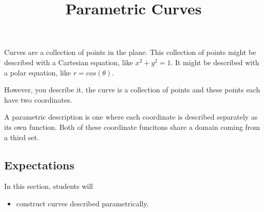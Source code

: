 \documentclass{ximera}
\title{Parametric Curves}
\begin{document}
\begin{abstract}
%
\end{abstract}
\maketitle




Curves are a collection of points in the plane.  This collection of points might be described with a Cartesian equation, like $x^2 + y^2 = 1$.  It might be described with a polar equation, like $r = cos(\theta)$.

However, you describe it, the curve is a collection of points and these points each have two coordinates.


A parametric description is one where each coordinate is described separately as its own function. Both of these coordinate funcitons share a domain coming from a third set.











\subsection{Expectations}

\begin{sectionOutcomes}
In this section, students will 

\begin{itemize}
\item construct curves described parametrically.

\end{itemize}
\end{sectionOutcomes}
\end{document}
